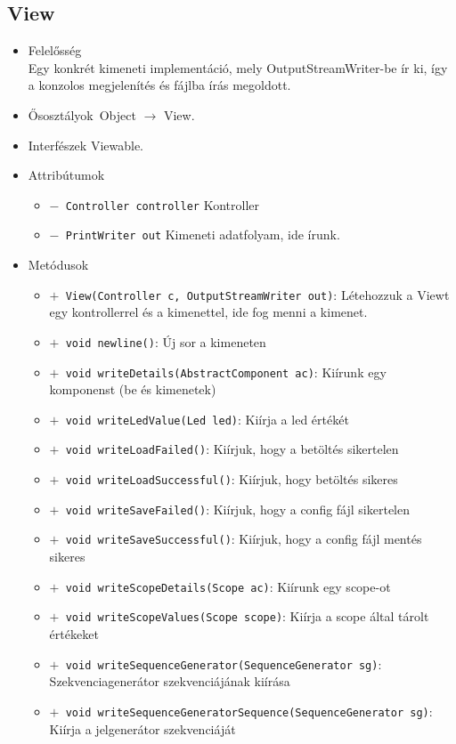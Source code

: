 \subsection{View}
\begin{itemize}
\item Felelősség\\
Egy konkrét kimeneti implementáció, mely OutputStreamWriter-be ír ki,  így a konzolos megjelenítés és fájlba írás megoldott.
\item Ősosztályok\ Object $\rightarrow{}$ View.
\item Interfészek Viewable.
\item Attribútumok $\ $
\begin{itemize}
	\item[] \texttt{$-$ Controller controller} Kontroller
	\item[] \texttt{$-$ PrintWriter out} Kimeneti adatfolyam, ide írunk.
\end{itemize}
\item Metódusok$\ $
\begin{itemize}
	\item[] \texttt{$+$ View(Controller c, OutputStreamWriter out)}: Létehozzuk a Viewt egy kontrollerrel és a kimenettel, ide fog menni a kimenet.
	\item[] \texttt{$+$ void newline()}: Új sor a kimeneten
	\item[] \texttt{$+$ void writeDetails(AbstractComponent ac)}: Kiírunk egy komponenst (be és kimenetek)
	\item[] \texttt{$+$ void writeLedValue(Led led)}: Kiírja a led értékét
	\item[] \texttt{$+$ void writeLoadFailed()}: Kiírjuk, hogy a betöltés sikertelen
	\item[] \texttt{$+$ void writeLoadSuccessful()}: Kiírjuk, hogy betöltés sikeres
	\item[] \texttt{$+$ void writeSaveFailed()}: Kiírjuk, hogy a config fájl sikertelen
	\item[] \texttt{$+$ void writeSaveSuccessful()}: Kiírjuk, hogy a config fájl mentés sikeres
	\item[] \texttt{$+$ void writeScopeDetails(Scope ac)}: Kiírunk egy scope-ot
	\item[] \texttt{$+$ void writeScopeValues(Scope scope)}: Kiírja a scope által tárolt értékeket
	\item[] \texttt{$+$ void writeSequenceGenerator(SequenceGenerator sg)}: Szekvenciagenerátor szekvenciájának kiírása
	\item[] \texttt{$+$ void writeSequenceGeneratorSequence(SequenceGenerator sg)}: Kiírja a jelgenerátor szekvenciáját

\end{itemize}
\end{itemize}
